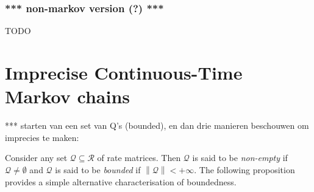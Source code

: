 \documentclass[10pt]{paper}
\theoremstyle{definition}
\newtheorem{lemma}[theorem]{Lemma}
\newcommand{\rateset}{\mathcal{Q}}
\newcommand{\norm}[1]{\left\lVert #1 \right\rVert}
\begin{document}
\subsubsection{*** non-markov version (?) ***}
TODO

%


\section{Imprecise Continuous-Time Markov chains}
\label{sec:iCTMC}

*** starten van een set van Q's (bounded), en dan drie manieren beschouwen om imprecies te maken:

Consider any set $\rateset\subseteq\mathcal{R}$ of rate matrices. Then $\rateset$ is said to be \emph{non-empty} if $\rateset\neq\emptyset$ and $\rateset$ is said to be \emph{bounded} if $\norm{\rateset}<+\infty$. The following proposition provides a simple alternative characterisation of boundedness.
\end{document}
